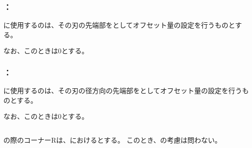 \subsubsection{\indexTLCEndFacecutMilling\nameTLCorrection：\nameEndFacecutMilling}
\EndFacecutMilling に使用する\indexTLFaceMill\nameFaceMill の\nameToolLength は、その刃の先端部を\ToolLength としてオフセット量の設定を行うものとする。

なお、このとき\TLCWearValue は0とする。

\subsubsection{\indexTDCEndFacecutMilling\nameTDCorrection：\nameEndFacecutMilling}
\EndFacecutMilling に使用する\indexTDFaceMill\nameFaceMill の\nameToolDiameter は、その刃の径方向の先端部を\ToolDiameter としてオフセット量の設定を行うものとする。

なお、このとき\TDCWearValue は0とする。


\subsection{\EndFacecutCornerR}
\nameEndFacecutMilling の際のコーナーRは、\nameEndFace における\nameIDCornerR とする。
このとき、\PlatingThk の考慮は問わない。


\clearpage


